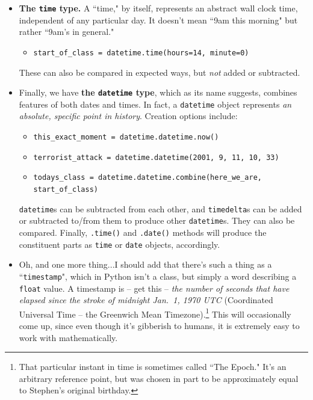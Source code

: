\documentclass[12pt]{article}
\begin{document}
\begin{itemize}
    You can also compare dates with comparison operators like \texttt{<} and
\texttt{>=}.

\item \textbf{The \texttt{time} type.} A ``time," by itself, represents an
abstract wall clock time, independent of any particular day. It doesn't mean
``9am this morning" but rather ``9am's in general."
    \begin{itemize}
    \itemsep.1em
    \item \texttt{start\_of\_class = datetime.time(hours=14, minute=0)}
    \end{itemize}

    These can also be compared in expected ways, but \textit{not} added or
subtracted.

\item Finally, we have \textbf{the \texttt{datetime} type}, which as its name
suggests, combines features of both dates and times. In fact, a
\texttt{datetime} object represents \textit{an absolute, specific point in
history}. Creation options include:
    \small
    \begin{itemize}
    \itemsep.1em
    \item \texttt{this\_exact\_moment = datetime.datetime.now()}
    \item \texttt{terrorist\_attack = datetime.datetime(2001, 9, 11, 10, 33)}
    \item \texttt{todays\_class = datetime.datetime.combine(here\_we\_are, start\_of\_class)}
    \end{itemize}
    \normalsize

    \texttt{datetime}s can be subtracted from each other, and
\texttt{timedelta}s can be added or subtracted to/from them to produce other
\texttt{datetime}s. They can also be compared. Finally, \texttt{.time()} and
\texttt{.date()} methods will produce the constituent parts as \texttt{time}
or \texttt{date} objects, accordingly.

\item Oh, and one more thing...I should add that there's such a thing as a
``\texttt{timestamp}", which in Python isn't a class, but simply a word
describing a \texttt{float} value. A timestamp is -- get this -- \textit{the
number of seconds that have elapsed since the stroke of midnight Jan.~1, 1970
UTC} (Coordinated Universal Time -- the Greenwich Mean
Timezone).\footnote{That particular instant in time is sometimes called ``The
Epoch." It's an arbitrary reference point, but was chosen in part to be
approximately equal to Stephen's original birthday.} This will occasionally
come up, since even though it's gibberish to humans, it is extremely easy to
work with mathematically.

\end{itemize}
\end{document}
